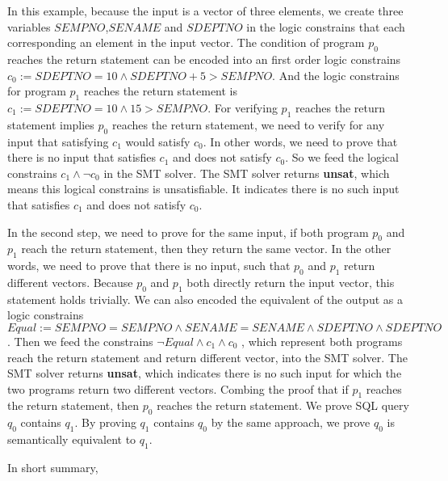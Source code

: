 %
In this example, because the input is a vector of three elements, we create three variables $SEMPNO$,$SENAME$ and $SDEPTNO$ in the logic constrains that each 
corresponding an element in the input vector.
%
The condition of program $p_0$ reaches the return statement can be encoded into an first order logic constrains \\
$c_0 := SDEPTNO = 10 \land SDEPTNO + 5 > SEMPNO$.
%
And the logic constrains for program $p_1$ reaches the return statement is $c_1 := SDEPTNO = 10 \land 15 > SEMPNO$.
%
For verifying $p_1$ reaches the return statement implies $p_0$ reaches the return statement, 
we need to verify for any input that satisfying $c_1$ would satisfy $c_0$.
%
In other words, we need to prove that there is no input that satisfies $c_1$ and does not satisfy $c_0$.
%
So we feed the logical constrains $c_1 \land \neg c_0$ in the SMT solver. 
%
The SMT solver returns \textbf{unsat}, which means this logical constrains is unsatisfiable.
%
It indicates there is no such input that satisfies $c_1$ and does not satisfy $c_0$.

%
In the second step, we need to prove for the same input, if both program $p_0$ and $p_1$ reach the return statement, then they return the same vector.
%
In the other words, we need to prove that there is no input, such that $p_0$ and $p_1$ return different vectors.
%
Because $p_0$ and $p_1$ both directly return the input vector, this statement holds trivially.
%
We can also encoded the equivalent of the output as a logic constrains $Equal := SEMPNO = SEMPNO \land SENAME = SENAME \land  SDEPTNO \land SDEPTNO$.
%
Then we feed the constrains $\neg Equal \land c_1 \land c_0$ , which represent both programs reach the return statement and return different vector, 
into the SMT solver.
%
The SMT solver returns \textbf{unsat}, which indicates there is no such input for which the two programs return two different vectors.
%
Combing the proof that if $p_1$ reaches the return statement, then $p_0$ reaches the return statement.
%
We prove SQL query $q_0$ contains $q_1$.
%
By proving $q_1$ contains $q_0$ by the same approach, we prove $q_0$ is semantically equivalent to $q_1$.

In short summary, 

